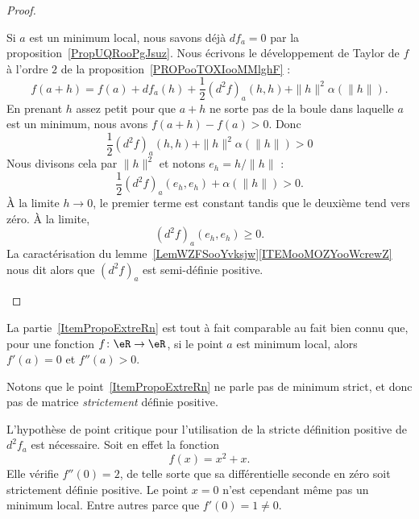 \begin{proof}
\begin{subproof}
		\spitem[\ref{ItemPropoExtreRn}]
		Si \( a\) est un minimum local, nous savons déjà \( df_a=0\) par la proposition~\ref{PropUQRooPgJsuz}. Nous écrivons le développement de Taylor de \( f\) à l'ordre \( 2\) de la proposition~\ref{PROPooTOXIooMMlghF} :
		\begin{equation}
			f(a+h)=f(a)+df_a(h)+\frac{ 1 }{2}(d^2f)_a(h,h)+\| h \|^2\alpha(\| h \|).
		\end{equation}
		En prenant \( h\) assez petit pour que \( a+h\) ne sorte pas de la boule dans laquelle \( a\) est un minimum, nous avons \( f(a+h)-f(a)>0\). Donc
		\begin{equation}
			\frac{ 1 }{2}(d^2f)_a(h,h)+\| h \|^2\alpha(\| h \|)>0
		\end{equation}
		Nous divisons cela par \( \| h \|^2\) et notons \( e_h=h/\| h \|\) :
		\begin{equation}
			\frac{ 1 }{2}(d^2f)_a(e_h,e_h)+\alpha(\| h \|)>0.
		\end{equation}
		À la limite \( h\to 0\), le premier terme est constant tandis que le deuxième tend vers zéro. À la limite,
		\begin{equation}
			(d^2f)_a(e_h,e_h)\geq 0.
		\end{equation}
		La caractérisation du lemme~\ref{LemWZFSooYvksjw}\ref{ITEMooMOZYooWcrewZ} nous dit alors que \( (d^2f)_a\) est semi-définie positive.
	\end{subproof}
\end{proof}

La partie~\ref{ItemPropoExtreRn} est tout à fait comparable au fait bien connu que, pour une fonction \( f\colon \eR\to \eR\), si le point \( a\) est minimum local, alors \( f'(a)=0\) et \( f''(a)>0\).

Notons que le point~\ref{ItemPropoExtreRn} ne parle pas de minimum strict, et donc pas de matrice \emph{strictement} définie positive.

\begin{example}
	L'hypothèse de point critique pour l'utilisation de la stricte définition positive de \( d^2f_a\) est nécessaire. Soit en effet la fonction
	\begin{equation}
		f(x)=x^2+x.
	\end{equation}
	Elle vérifie \( f''(0)=2\), de telle sorte que sa différentielle seconde en zéro soit strictement définie positive. Le point \( x=0\) n'est cependant même pas un minimum local. Entre autres parce que \( f'(0)=1\neq 0\).
\end{example}

